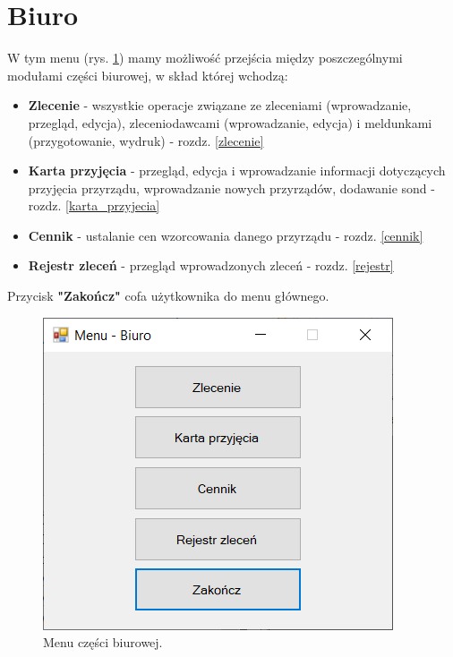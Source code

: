
\rozdzial

\section{Biuro}
\label{biuro}

W tym menu (rys. \ref{menuBiuro}) mamy możliwość przejścia między poszczególnymi modułami części biurowej, w skład której wchodzą:
\begin{itemize}
	\item \textbf{Zlecenie} - wszystkie operacje związane ze zleceniami (wprowadzanie, przegląd, edycja), zleceniodawcami (wprowadzanie, edycja) i meldunkami (przygotowanie, wydruk) - rozdz. \ref{zlecenie}
	\item \textbf{Karta przyjęcia} - przegląd, edycja i wprowadzanie informacji dotyczących przyjęcia przyrządu, wprowadzanie nowych przyrządów, dodawanie sond - rozdz. \ref{karta_przyjecia}
	\item \textbf{Cennik} - ustalanie cen wzorcowania danego przyrządu - rozdz. \ref{cennik}
	\item \textbf{Rejestr zleceń} - przegląd wprowadzonych zleceń - rozdz. \ref{rejestr}
\end{itemize}

Przycisk \textbf{"Zakończ"} cofa użytkownika do menu głównego.

\begin{figure}[htb]
	\centering
	\includegraphics{obrazki/Biuro/menu_biuro.png}
	\caption{Menu części biurowej.}
	\label{menuBiuro}
\end{figure}

